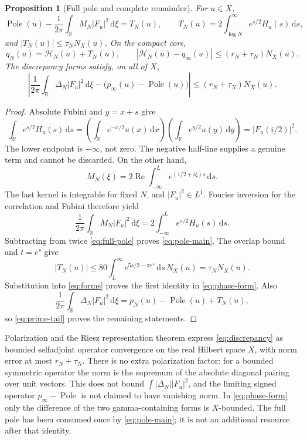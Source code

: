 \documentclass[11pt]{article}
\newtheorem{proposition}[theorem]{Proposition}
\theoremstyle{remark}\newtheorem{remark}[theorem]{Remark}
\newcommand{\R}{\mathbb R}
\newcommand{\dd}{\,\mathrm d}
\newcommand{\Pole}{\operatorname{Pole}}
\newcommand{\HH}{\mathcal H}
\numberwithin{equation}{section}
\begin{document}
\begin{proposition}[Full pole and complete remainder]\label{prop:phase}
For $u\in X$,
\begin{equation}\label{eq:pole-main}
 \Pole(u)-\frac1{2\pi}\int_\R M_N|F_u|^2\dd\xi=T_N(u),\qquad
 T_N(u)=2\int_{\log N}^\infty e^{s/2}H_u(s)\dd s,
\end{equation}
and $|T_N(u)|\le\tau_NN_X(u)$. On the compact core,
\begin{equation}\label{eq:phase-form}
 q_N(u)=\HH_N(u)+T_N(u),\qquad
 |\HH_N(u)-q_\infty(u)|\le(r_N+\tau_N)N_X(u).
\end{equation}
The discrepancy forms satisfy, on all of $X$,
\begin{equation}\label{eq:discrepancy}
 \left|\frac1{2\pi}\int_\R\Delta_N|F_u|^2\dd\xi
          -\bigl(p_\infty(u)-\Pole(u)\bigr)\right|
 \le(r_N+\tau_N)N_X(u).
\end{equation}
\end{proposition}
\begin{proof}
Absolute Fubini and $y=x+s$ give
\begin{equation}\label{eq:full-pole}
 \int_\R e^{s/2}H_u(s)\dd s
 =\left(\int_\R e^{-x/2}u(x)\dd x\right)
  \left(\int_\R e^{y/2}u(y)\dd y\right)=|F_u(i/2)|^2.
\end{equation}
The lower endpoint is $-\infty$, not zero. The negative half-line supplies
a genuine term and cannot be discarded. On the other hand,
\[
 M_N(\xi)=2\operatorname{Re}\int_{-\infty}^L e^{(1/2+i\xi)s}\dd s.
\]
The last kernel is integrable for fixed $N$, and $|F_u|^2\in L^1$.
Fourier inversion for the correlation and Fubini therefore yield
\[
 \frac1{2\pi}\int_\R M_N|F_u|^2\dd\xi
       =2\int_{-\infty}^L e^{s/2}H_u(s)\dd s.
\]
Subtracting from twice \eqref{eq:full-pole} proves
\eqref{eq:pole-main}. The overlap bound and $t=e^s$ give
\[
 |T_N(u)|\le80\int_L^\infty e^{5s/2-\pi e^s}\dd s\,N_X(u)
 =\tau_NN_X(u).
\]
Substitution into \eqref{eq:forms} proves the first identity in
\eqref{eq:phase-form}. Also
\[
 \frac1{2\pi}\int_\R\Delta_N|F_u|^2\dd\xi
       =p_N(u)-\Pole(u)+T_N(u),
\]
so \eqref{eq:prime-tail} proves the remaining statements.
\end{proof}

Polarization and the Riesz representation theorem express
\eqref{eq:discrepancy} as bounded selfadjoint operator convergence on the
real Hilbert space $X$, with norm error at most $r_N+\tau_N$. There is no
extra polarization factor: for a bounded symmetric operator the norm is
the supremum of the absolute diagonal pairing over unit vectors. This
does not bound $\int|\Delta_N||F_u|^2$, and the limiting signed operator
$p_\infty-\Pole$ is not claimed to have vanishing norm. In
\eqref{eq:phase-form} only the difference of the two gamma-containing
forms is $X$-bounded. The full pole has been consumed once by
\eqref{eq:pole-main}; it is not an additional resource after that identity.
\end{document}
